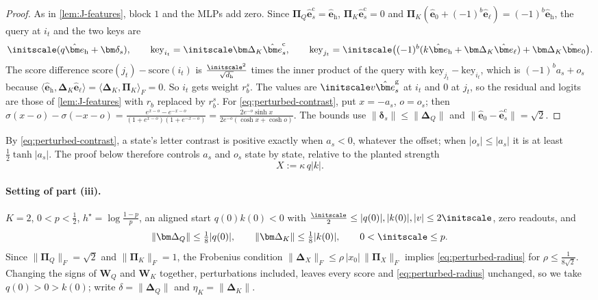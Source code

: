 \begin{proof}
As in \cref{lem:J-features}, block $1$ and the MLPs add zero. Since $\bm\Pi_Q\hat{\bm e}^{\mathrm c}_s=\hat{\bm e}_{\mathrm h}$,
$\bm\Pi_K\hat{\bm e}^{\mathrm c}_s=0$ and $\bm\Pi_K(\hat{\bm e}_0+(-1)^b\hat{\bm e}_\ell)=(-1)^b\hat{\bm e}_{\mathrm h}$, the query at $i_t$ and the
two keys are
\[
 \initscale(q\hat{\bm e}_{\mathrm h}+\bm\delta_s),\qquad \mathrm{key}_{i_t}=\initscale\bm\Delta_K\hat{\bm e}^{\mathrm c}_s,\qquad
 \mathrm{key}_{j_t}=\initscale\bigl((-1)^b(k\hat{\bm e}_{\mathrm h}+\bm\Delta_K\hat{\bm e}_\ell)+\bm\Delta_K\hat{\bm e}_0\bigr).
\]
The score difference $\mathrm{score}(j_t)-\mathrm{score}(i_t)$ is $\frac{\initscale^2}{\sqrt{d_{\mathrm h}}}$ times the inner product of the query with
$\mathrm{key}_{j_t}-\mathrm{key}_{i_t}$, which is $(-1)^ba_s+o_s$ because $\langle\hat{\bm e}_{\mathrm h},\bm\Delta_K\hat{\bm e}_\ell\rangle=\langle\bm\Delta_K,\bm\Pi_K\rangle_F=0$.
So $i_t$ gets weight $r^s_b$. The values are $\initscale v\hat{\bm e}^{\mathrm g}_s$ at $i_t$ and $0$ at $j_t$, so the residual and logits are those of
\cref{lem:J-features} with $r_b$ replaced by $r^s_b$. For \cref{eq:perturbed-contrast}, put $x=-a_s$, $o=o_s$; then
$\sigma(x-o)-\sigma(-x-o)=\frac{e^{x-o}-e^{-x-o}}{(1+e^{x-o})(1+e^{-x-o})}=\frac{2e^{-o}\sinh x}{2e^{-o}(\cosh x+\cosh o)}$. The bounds use
$\|\bm\delta_s\|\le\|\bm\Delta_Q\|$ and $\|\hat{\bm e}_0-\hat{\bm e}^{\mathrm c}_s\|=\sqrt2$.
\end{proof}

By \cref{eq:perturbed-contrast}, a state's letter contrast is positive exactly when $a_s<0$, whatever the offset; when $|o_s|\le|a_s|$ it is at
least $\frac12\tanh|a_s|$. The proof below therefore controls $a_s$ and $o_s$ state by state, relative to the planted strength
\[
 X:=\kappa\,q|k|.
\]

\paragraph{Setting of part (iii).} $K=2$, $0<p<\frac12$, $h^\star=\log\frac{1-p}{p}$, an aligned start $q(0)k(0)<0$ with
$\frac{\initscale}{2}\le|q(0)|,|k(0)|,|v|\le2\initscale$, zero readouts, and
\begin{equation}
 \|\bm\Delta_Q\|\le\tfrac18|q(0)|,\qquad \|\bm\Delta_K\|\le\tfrac18|k(0)|,\qquad 0<\initscale\le p .
 \label{eq:perturbed-radius}
\end{equation}
Since $\|\bm\Pi_Q\|_F=\sqrt2$ and $\|\bm\Pi_K\|_F=1$, the Frobenius condition $\|\bm\Delta_X\|_F\le\rho\,|x_0|\,\|\bm\Pi_X\|_F$ implies
\cref{eq:perturbed-radius} for $\rho\le\frac{1}{8\sqrt2}$. Changing the signs of $\mathbf W_Q$ and $\mathbf W_K$ together, perturbations included, leaves every score
and \cref{eq:perturbed-radius} unchanged, so we take $q(0)>0>k(0)$; write $\delta=\|\bm\Delta_Q\|$ and $\eta_K=\|\bm\Delta_K\|$.

